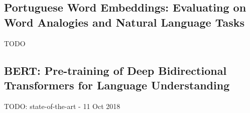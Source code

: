
\subsection{Portuguese Word Embeddings: Evaluating on Word Analogies and Natural
Language Tasks}

TODO


\subsection{BERT: Pre-training of Deep Bidirectional Transformers for Language Understanding}

TODO: state-of-the-art - 11 Oct 2018